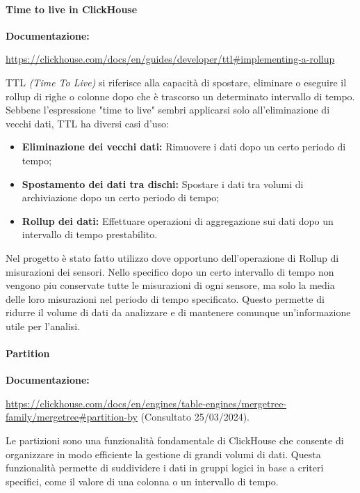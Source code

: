 \paragraph{Time to live in ClickHouse} \label{sec:RollupTTL}
\textbf{Documentazione:}

\url{https://clickhouse.com/docs/en/guides/developer/ttl#implementing-a-rollup}\newline

TTL \textit{(Time To Live)} si riferisce alla capacità di spostare, eliminare o eseguire il rollup di righe o colonne dopo che è trascorso un determinato intervallo di tempo. Sebbene l'espressione "time to live" sembri applicarsi solo all'eliminazione di vecchi dati, TTL ha diversi casi d'uso:

\begin{itemize}
	\item \textbf{Eliminazione dei vecchi dati:} Rimuovere i dati dopo un certo periodo di tempo;
	\item \textbf{Spostamento dei dati tra dischi:} Spostare i dati tra volumi di archiviazione dopo un certo periodo di tempo;
	\item \textbf{Rollup dei dati:} Effettuare operazioni di aggregazione sui dati dopo un intervallo di tempo prestabilito.
\end{itemize}

Nel progetto è stato fatto utilizzo dove opportuno dell'operazione di Rollup di misurazioni dei sensori.
Nello specifico dopo un certo intervallo di tempo non vengono piu conservate tutte le misurazioni di ogni sensore, ma solo la media delle loro misurazioni nel periodo di tempo specificato. Questo permette di ridurre il volume di dati da analizzare e di mantenere comunque un'informazione utile per l'analisi.

\paragraph{Partition}\label{sec:Partition}
\textbf{Documentazione:}

\url{https://clickhouse.com/docs/en/engines/table-engines/mergetree-family/mergetree#partition-by} (Consultato 25/03/2024).

Le partizioni sono una funzionalità fondamentale di ClickHouse che consente di organizzare in modo efficiente la gestione di grandi volumi di dati. Questa funzionalità permette di suddividere i dati in gruppi logici in base a criteri specifici, come il valore di una colonna o un intervallo di tempo.

